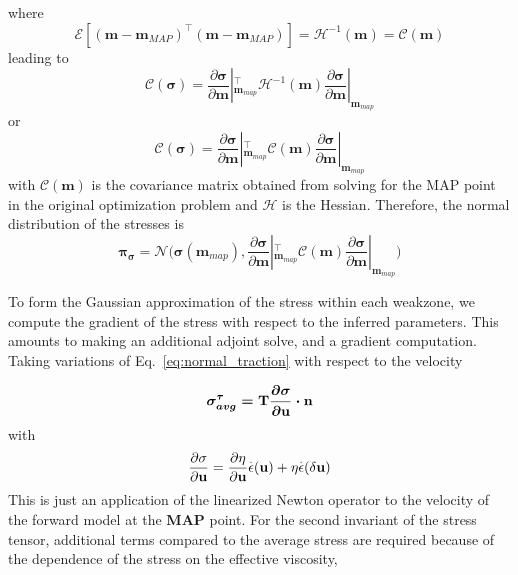 \documentclass[12pt]{article}
\newcommand{\mm}{{\ensuremath{\boldsymbol{m}}}}
\newcommand{\ppi}{{\ensuremath{\boldsymbol{\pi}}}}
\newcommand{\ssigma}{{\ensuremath{\boldsymbol{\sigma}}}}
\begin{document}
{\begin{equation}
\end{equation}
where 
\begin{equation}
  \mathcal E[(\mm-\mm_{MAP})^\intercal(\mm-\mm_{MAP})] = \mathcal H^{-1}(\mm) = \mathcal C(\mm)
  \label{eq:hessian_inverse}
  \end{equation}
leading to
\begin{equation}
\mathcal C(\ssigma) = \frac{\partial\ssigma}{\partial \mm}|_{\mm_{map}}^\intercal \mathcal H^{-1}(\mm)\frac{\partial\ssigma}{\partial \mm}|_{\mm_{map}}
\end{equation}
or 
\begin{equation}
\mathcal C(\ssigma) = \frac{\partial\ssigma}{\partial \mm}|_{\mm_{map}}^\intercal \mathcal C(\mm)\frac{\partial\ssigma}{\partial \mm}|_{\mm_{map}}
\end{equation}
with $\mathcal C(\mm)$ is the covariance matrix obtained from solving for the MAP point in the original optimization problem
and $\mathcal H$ is the Hessian.
Therefore, the normal distribution of the stresses is
\begin{equation}
  \ppi_{\ssigma} = \mathcal N\big(\ssigma(\mm_{map}), \frac{\partial\ssigma}{\partial \mm}|_{\mm_{map}}^\intercal \mathcal C(\mm)\frac{\partial\ssigma}{\partial \mm}|_{\mm_{map}}\big)
\end{equation}

To form the Gaussian approximation of the stress within each weakzone, we compute the gradient of the stress with respect to the inferred parameters. This amounts to making an additional adjoint solve, and a gradient computation. Taking variations of Eq.~\eqref{eq:normal_traction} with respect to the velocity

\begin{equation}
\sigma^{\tau}_{avg}=\boldmath{\mathrm{T}}\frac{\partial\sigma}{\partial \textbf u}\cdot \textbf n
\end{equation}
with
\begin{equation}
\frac{\partial\sigma}{\partial \textbf u} = \frac{\partial \eta}{\partial \textbf u}\overset{.}{\epsilon}(\textbf u)
                                            + \eta\overset{.}{\epsilon}(\delta \textbf u)
\end{equation}
This is just an application of the linearized Newton operator to the velocity of the forward model at the \textbf{MAP} point.
For the second invariant of the stress tensor, additional terms compared to the average stress are required because of the dependence of the stress on the effective viscosity,

}
\end{document}
